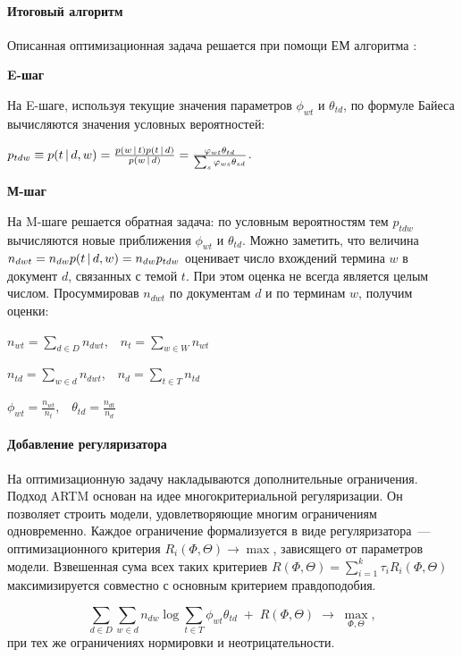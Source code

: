\documentclass[12pt, twoside]{article}
\begin{document}
\paragraph{Итоговый алгоритм}

Описанная оптимизационная задача решается при помощи ЕМ алгоритма \cite{hofmann1999probabilistic}:

\noindent\textbf{E-шаг}

На E-шаге, используя текущие значения параметров $\phi_{wt}$ и $\theta_{td}$, по формуле Байеса вычисляются значения условных вероятностей:

$p_{tdw} \equiv p(t \mspace{3mu}{|}\mspace{3mu} d,w) = \frac {p(w \mspace{3mu}{|}\mspace{3mu} t)p(t \mspace{3mu}{|}\mspace{3mu} d)} {p(w \mspace{3mu}{|}\mspace{3mu} d)} = \frac {\varphi_{wt}\theta_{td}} {\sum_s\varphi_{ws}\theta_{sd}}$.

\noindent\textbf{М-шаг}

На M-шаге решается обратная задача: по условным вероятностям тем $p_{tdw}$ вычисляются новые приближения $\phi_{wt}$ и $\theta_{td}$.
Можно заметить, что величина $n_{dwt}=n_{dw}p(t \mspace{3mu}{|}\mspace{3mu} d,w)=n_{dw}p_{tdw}$ оценивает число вхождений термина $w$ в документ $d$, связанных с темой $t$. При этом оценка не всегда является целым числом. Просуммировав $n_{dwt}$ по документам $d$ и по терминам $w$, получим оценки:

$n_{wt}=\sum_{d \in D} n_{dwt}$,~~$n_t = \sum_{w \in W}n_{wt}$

$n_{td}=\sum_{w \in d} n_{dwt}$,~~$n_d = \sum_{t \in T}n_{td}$

$\phi_{wt}=\frac{n_{wt}}{n_t}$,~~$\theta_{td} = \frac{n_{dt}}{n_{d}}$


\paragraph{Добавление регуляризатора}

На оптимизационную задачу накладываются дополнительные ограничения. Подход ARTM \cite{vorontsov2014additive,vorontsov2014tutorial,vorontsov2015additive} основан на идее многокритериальной регуляризации. Он позволяет строить модели, удовлетворяющие многим ограничениям одновременно. Каждое ограничение формализуется в виде регуляризатора~--- оптимизационного критерия $R_i(\Phi,\Theta)\to\max$, зависящего от параметров модели. Взвешенная сума всех таких критериев $R(\Phi,\Theta) = \sum_{i=1}^k \tau_i R_i(\Phi,\Theta)$ максимизируется совместно с основным критерием правдоподобия.

\begin{equation}
\label{artm_optimization}
\sum_{d\in D} \sum_{w\in d} n_{dw}\log \sum_{t\in T} \phi_{wt}\theta_{td} \;+\; R(\Phi,\Theta)\;\to\; \max_{\Phi,\Theta},
\end{equation}
при тех же ограничениях нормировки и неотрицательности.
\end{document}
